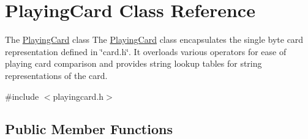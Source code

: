 \hypertarget{classPlayingCard}{\section{Playing\-Card Class Reference}
\label{classPlayingCard}
}


The \hyperlink{classPlayingCard}{Playing\-Card} class The \hyperlink{classPlayingCard}{Playing\-Card} class encapsulates the single byte card representation defined in \char`\"{}card.\-h\char`\"{}. It overloads various operators for ease of playing card comparison and provides string lookup tables for string representations of the card.  




{\ttfamily \#include $<$playingcard.\-h$>$}

\subsection*{Public Member Functions}
